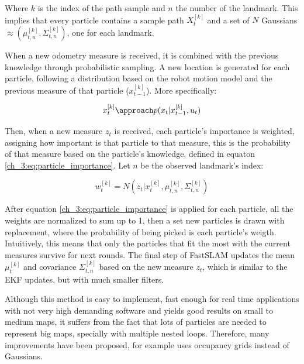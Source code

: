       Where $k$ is the index of the path sample and $n$ the number of the landmark. This implies that every particle contains a sample path $X_{t}^{[k]}$ and a set of $N$ Gaussians $\approx (\mu_{t,n}^{[k]}, \Sigma_{t,n}^{[k]})$, one for each landmark.

      When a new odometry measure is received, it is combined with the previous knowledge through probabilistic sampling. A new location is generated for each particle, following a distribution based on the robot motion model and the previous measure of that particle ($x_{t-1}^{[k]}$). More specifically:

      \begin{equation} \label{ch_3:eq:particle_update}
        x_{t}^{[k]} \approach p(x_{t} | x_{t-1}^{[k]}, u_{t})
      \end{equation}

      Then, when a new measure $z_{t}$ is received, each particle's importance is weighted, assigning how important is that particle to that measure, this is the probability of that measure based on the particle's knowledge, defined in equaton \ref{ch_3:eq:particle_importance}. Let $n$ be the observed landmark's index:

      \begin{equation} \label{ch_3:eq:particle_importance}
        w_{t}^{[k]} = N(z_{t} | x_{t}^{[k]}, \mu_{t,n}^{[k]}, \Sigma_{t,n}^{[k]})
      \end{equation}

      After equation \ref{ch_3:eq:particle_importance} is applied for each particle, all the weights are normalized to sum up to 1, then a set new particles is drawn with replacement, where the probability of being picked is each particle's weigth. Intuitively, this means that only the particles that fit the most with the current measures survive for next rounds. The final step of FastSLAM updates the mean $\mu_{t}^{[k]}$ and covariance $\Sigma_{t,n}^{[k]}$ based on the new measure $z_{t}$, which is similar to the EKF updates, but with much smaller filters.

      Although this method is easy to implement, fast enough for real time applications with not very high demanding software and yields good results on small to medium maps, it suffers from the fact that lots of particles are needed to represent big maps, specially with multiple nested loops. Therefore, many improvements have been proposed, \cite{Grisetti2007} for example uses occupancy grids instead of Gaussians.

